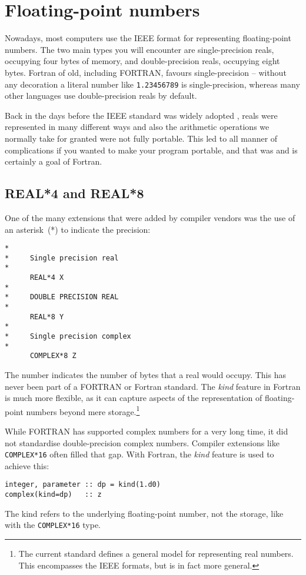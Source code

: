 \section{Floating-point numbers}
Nowadays, most computers use the IEEE format for representing floating-point numbers.
The two main types you will encounter are single-precision reals, occupying four
bytes of memory, and double-precision reals, occupying eight bytes. Fortran of old,
including FORTRAN, favours single-precision -- without any decoration a literal
number like \verb+1.23456789+ is single-precision, whereas many other languages
use double-precision reals by default.

Back in the days before the IEEE standard was widely adopted \cite{IEEE}, reals were
represented in many different ways and also the arithmetic operations we normally take
for granted were not fully portable. This led to all manner of complications if
you wanted to make your program portable, and that was and is certainly a goal of Fortran.

\subsection{REAL*4 and REAL*8}
One of the many extensions that were added by compiler vendors was the use of an asterisk~(*)
to indicate the precision:
\begin{verbatim}
*
*     Single precision real
*
      REAL*4 X
*
*     DOUBLE PRECISION REAL
*
      REAL*8 Y
*
*     Single precision complex
*
      COMPLEX*8 Z
\end{verbatim}
The number indicates the number of bytes that a real would occupy. This has never been
part of a FORTRAN or Fortran standard. The \emph{kind} feature in Fortran is much more
flexible, as it can capture aspects of the representation of floating-point numbers
beyond mere storage.\footnote{The current standard defines a general model for representing
real numbers. This encompasses the IEEE formats, but is in fact more general.}

While FORTRAN has supported complex numbers for a very long time, it did not standardise
double-precision complex numbers. Compiler extensions like \verb+COMPLEX*16+ often
filled that gap. With Fortran, the \emph{kind} feature is used to achieve this:
\begin{verbatim}
integer, parameter :: dp = kind(1.d0)
complex(kind=dp)   :: z
\end{verbatim}

The kind refers to the underlying floating-point number, not the storage, like with
the \verb+COMPLEX*16+ type.

